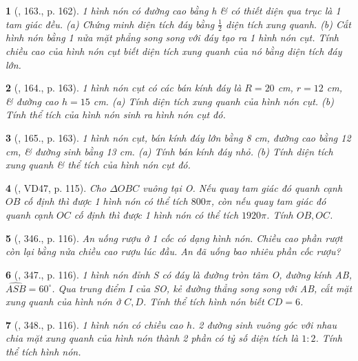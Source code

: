 \documentclass{article}
\newtheorem{baitoan}{}
\begin{document}
\begin{baitoan}[\cite{Tuyen_Toan_9_old}, 163., p. 162]
	1 hình nón có đường cao bằng h \& có thiết diện qua trục là 1 tam giác đều. (a) Chứng minh diện tích đáy bằng $\frac{1}{2}$ diện tích xung quanh. (b) Cắt hình nón bằng 1 nửa mặt phẳng song song với đáy tạo ra 1 hình nón cụt. Tính chiều cao của hình nón cụt biết diện tích xung quanh của nó bằng diện tích đáy lớn.
\end{baitoan}

\begin{baitoan}[\cite{Tuyen_Toan_9_old}, 164., p. 163]
	1 hình nón cụt có các bán kính đáy là $R = 20$ {\rm cm}, $r = 12$ {\rm cm}, \& đường cao $h = 15$ {\rm cm}. (a) Tính diện tích xung quanh của hình nón cụt. (b) Tính thể tích của hình nón sinh ra hình nón cụt đó.
\end{baitoan}

\begin{baitoan}[\cite{Tuyen_Toan_9_old}, 165., p. 163]
	1 hình nón cụt, bán kính đáy lớn bằng {\rm8 cm}, đường cao bằng {\rm12 cm}, \& đường sinh bằng {\rm13 cm}. (a) Tính bán kính đáy nhỏ. (b) Tính diện tích xung quanh \& thể tích của hình nón cụt đó.
\end{baitoan}

\begin{baitoan}[\cite{Binh_Toan_9_tap_2}, VD47, p. 115]
	Cho $\Delta OBC$ vuông tại O. Nếu quay tam giác đó quanh cạnh $OB$ cố định thì được 1 hình nón có thể tích $800\pi$, còn nếu quay tam giác đó quanh cạnh $OC$ cố định thì được 1 hình nón có thể tích $1920\pi$. Tính $OB,OC$.
\end{baitoan}

\begin{baitoan}[\cite{Binh_Toan_9_tap_2}, 346., p. 116]
	An uống rượu ở 1 cốc có dạng hình nón. Chiều cao phần rượt còn lại bằng nửa chiều cao rượu lúc đầu. An đã uống bao nhiêu phần cốc rượu?
\end{baitoan}

\begin{baitoan}[\cite{Binh_Toan_9_tap_2}, 347., p. 116]
	1 hình nón đỉnh S có đáy là đường tròn tâm O, đường kính AB, $\widehat{ASB} = 60^\circ$. Qua trung điểm I của SO, kẻ đường thẳng song song với AB, cắt mặt xung quanh của hình nón ở $C,D$. Tính thể tích hình nón biết $CD = 6$.
\end{baitoan}

\begin{baitoan}[\cite{Binh_Toan_9_tap_2}, 348., p. 116]
	1 hình nón có chiều cao $h$. 2 đường sinh vuông góc với nhau chia mặt xung quanh của hình nón thành 2 phần có tỷ số diện tích là $1:2$. Tính thể tích hình nón.
\end{baitoan}
\end{document}
